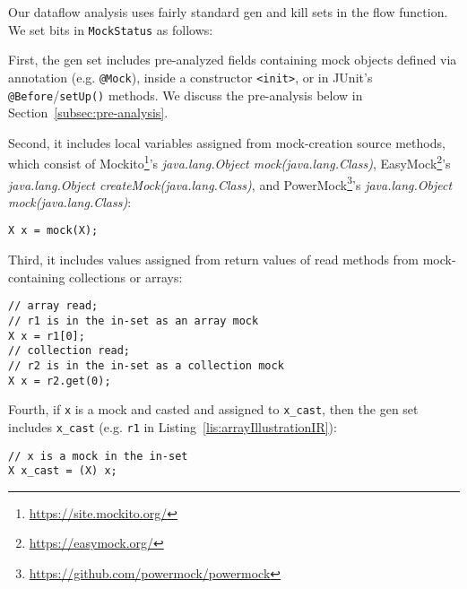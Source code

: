 

Our dataflow analysis uses fairly standard gen and kill sets in the flow function. We set bits in \texttt{MockStatus} as follows:

First, the gen set includes pre-analyzed fields containing mock objects defined via annotation (e.g. \texttt{@Mock}), inside a constructor \texttt{<init>}, or in JUnit's \texttt{@Before}/\texttt{setUp()} methods. We discuss the pre-analysis below in Section~\ref{subsec:pre-analysis}. 

Second, it includes local variables assigned from mock-creation source methods, which consist of Mockito\footnote{\url{https://site.mockito.org/}}'s \textit{java.lang.Object mock(java.lang.Class)}, EasyMock\footnote{\url{https://easymock.org/}}'s \textit{java.lang.Object createMock(java.lang.Class)}, and PowerMock\footnote{\url{https://github.com/powermock/powermock}}'s \textit{java.lang.Object mock(java.lang.Class)}:
\begin{lstlisting}[basicstyle=\ttfamily\small,numbers=none]
X x = mock(X);
\end{lstlisting}

Third, it includes values assigned from return values of read methods from mock-containing collections or arrays:
\begin{lstlisting}[basicstyle=\ttfamily\small,numbers=none]
// array read;
// r1 is in the in-set as an array mock
X x = r1[0];
// collection read;
// r2 is in the in-set as a collection mock
X x = r2.get(0);
\end{lstlisting}

Fourth, if \texttt{x} is a mock and casted and assigned to \texttt{x\_cast}, then the gen set includes \texttt{x\_cast} (e.g. \texttt{r1} in Listing~\ref{lis:arrayIllustrationIR}):
\begin{lstlisting}[basicstyle=\ttfamily\small,numbers=none]
// x is a mock in the in-set
X x_cast = (X) x;
\end{lstlisting}


